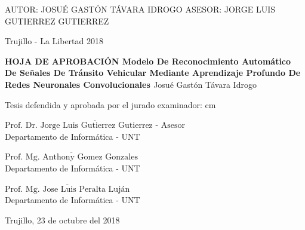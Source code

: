   \vskip 10cm 
  \begin{center}
     {\bf \doublespacing {\fontsize{17}{20.4}\selectfont{MODELO DE RECONOCIMIENTO AUTOMÁTICO DE SEÑALES DE TRÁNSITO VEHICULAR MEDIANTE APRENDIZAJE PROFUNDO DE REDES NEURONALES CONVOLUCIONALES }}}     
  \end{center}   
    \vskip 2cm
  \begin{verse}
   \fontsize{12}{14.4}
  \end{verse}

  \vskip 1.5cm 
  {\fontsize{14}{16.8}\selectfont AUTOR: JOSUÉ GASTÓN TÁVARA IDROGO} 
  \vskip 1.5cm 
  {\fontsize{14}{16.8}\selectfont ASESOR: JORGE LUIS GUTIERREZ GUTIERREZ} 
  \vskip 1cm 
  
  \begin{center}    
  \vskip 1.3cm
  {
  \fontsize{14}{16.8}\selectfont Trujillo - La Libertad
  \vskip 0.2cm  \hspace*{-0.2cm} 2018
  }
  \end{center} 
  \newpage


\begin{center}
 {\bf {\Large HOJA DE APROBACIÓN }     
 \vskip 1.5cm
  {\Large Modelo De Reconocimiento Automático De Señales De Tránsito Vehicular Mediante Aprendizaje Profundo De Redes Neuronales Convolucionales }}
 \vskip 1cm 
  {\large{Josué Gastón Távara Idrogo}}\\

 \vskip 1cm
\end{center} 
Tesis defendida y aprobada por el jurado examinador:
 cm
\begin{flushleft} 
$\overline{\mbox{Prof. Dr. Jorge Luis Gutierrez Gutierrez - Asesor}}$\\
\vskip -0.5cm
Departamento de Informática - UNT
\end{flushleft} 
\vskip 1cm
\begin{flushleft} 
$\overline{\mbox{Prof. Mg. Anthony Gomez Gonzales}}$\\
\vskip -0.5cm
Departamento de Informática - UNT
\end{flushleft} 
\vskip 1cm
\begin{flushleft} 
$\overline{\mbox{Prof. Mg. Jose Luis Peralta Luján}}$\\
\vskip -0.5cm
Departamento de Informática - UNT
\end{flushleft}
\vskip 0.1cm 
\begin{center}    
Trujillo, 23 de octubre del 2018
\end{center} 
\newpage


